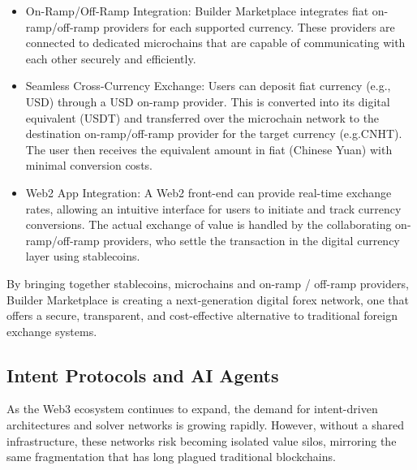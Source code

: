\begin{itemize}
    \item[1.] On-Ramp/Off-Ramp Integration: Builder Marketplace integrates fiat on-ramp/off-ramp providers for each supported currency. These providers are connected to dedicated microchains that are capable of communicating with each other securely and efficiently.

    \item[2.] Seamless Cross-Currency Exchange: Users can deposit fiat currency (e.g., USD) through a USD on-ramp provider. This is converted into its digital equivalent (USDT) and transferred over the microchain network to the destination on-ramp/off-ramp provider for the target currency (e.g.CNHT). The user then receives the equivalent amount in fiat (Chinese Yuan) with minimal conversion costs.

    \item[3.] Web2 App Integration: A Web2 front-end can provide real-time exchange rates, allowing an intuitive interface for users to initiate and track currency conversions. The actual exchange of value is handled by the collaborating on-ramp/off-ramp providers, who settle the transaction in the digital currency layer using stablecoins.
\end{itemize}

By bringing together stablecoins, microchains and on-ramp / off-ramp providers, Builder Marketplace is creating a next-generation digital forex network, one that offers a secure, transparent, and cost-effective alternative to traditional foreign exchange systems.


\subsection{Intent Protocols and AI Agents}

As the Web3 ecosystem continues to expand, the demand for intent-driven architectures and solver networks is growing rapidly. However, without a shared infrastructure, these networks risk becoming isolated value silos, mirroring the same fragmentation that has long plagued traditional blockchains.


